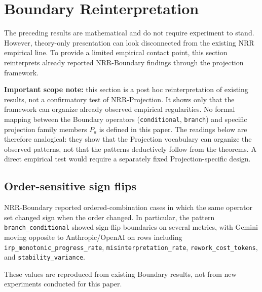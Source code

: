 \documentclass[11pt,a4paper]{article}
\begin{document}
\section{Boundary Reinterpretation}
\label{sec:boundary}

The preceding results are mathematical and do not require experiment to stand. However, theory-only presentation can look disconnected from the existing NRR empirical line. To provide a limited empirical contact point, this section reinterprets already reported NRR-Boundary findings \cite{saito2026boundary} through the projection framework.

\textbf{Important scope note:} this section is a post hoc reinterpretation of existing results, not a confirmatory test of NRR-Projection. It shows only that the framework can organize already observed empirical regularities. No formal mapping between the Boundary operators (\texttt{conditional}, \texttt{branch}) and specific projection family members $P_a$ is defined in this paper. The readings below are therefore analogical: they show that the Projection vocabulary can organize the observed patterns, not that the patterns deductively follow from the theorems. A direct empirical test would require a separately fixed Projection-specific design.

\subsection{Order-sensitive sign flips}

NRR-Boundary \cite{saito2026boundary} reported ordered-combination cases in which the same operator set changed sign when the order changed. In particular, the pattern \texttt{branch\_conditional} showed sign-flip boundaries on several metrics, with Gemini moving opposite to Anthropic/OpenAI on rows including \texttt{irp\_monotonic\_progress\_rate}, \texttt{misinterpretation\_rate}, \texttt{rework\_cost\_tokens}, and \texttt{stability\_variance}.

These values are reproduced from existing Boundary results, not from new experiments conducted for this paper.
\end{document}
